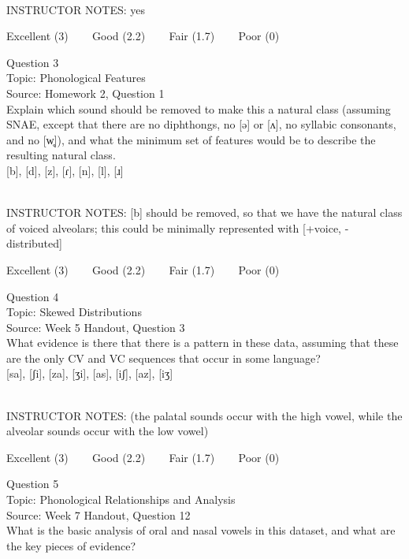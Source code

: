 \documentclass[12pt]{article}
\begin{document}
~\\
INSTRUCTOR NOTES: yes


\vfill
Excellent (3) ~~~ Good (2.2) ~~~ Fair (1.7) ~~~ Poor (0)
\newpage

{\large Question 3}\\

Topic: Phonological Features\\
Source: Homework 2, Question 1\\

Explain which sound should be removed to make this a natural class (assuming SNAE, except that there are no diphthongs, no [ə] or [ʌ], no syllabic consonants, and no [w̥]), and what the minimum set of features would be to describe the resulting natural class.\\

{[b]}, {[d]}, {[z]}, {[ɾ]}, {[n]}, {[l]}, {[ɹ]}


~\\
INSTRUCTOR NOTES: [b] should be removed, so that we have the natural class of voiced alveolars; this could be minimally represented with [+voice, -distributed]


\vfill
Excellent (3) ~~~ Good (2.2) ~~~ Fair (1.7) ~~~ Poor (0)
\newpage

{\large Question 4}\\

Topic: Skewed Distributions\\
Source: Week 5 Handout, Question 3\\

What evidence is there that there is a pattern in these data, assuming that these are the only CV and VC sequences that occur in some language?\\

{[sa]}, {[ʃi]}, {[za]}, {[ʒi]}, {[as]}, {[iʃ]}, {[az]}, {[iʒ]}


~\\
INSTRUCTOR NOTES: (the palatal sounds occur with the high vowel, while the alveolar sounds occur with the low vowel)


\vfill
Excellent (3) ~~~ Good (2.2) ~~~ Fair (1.7) ~~~ Poor (0)
\newpage

{\large Question 5}\\

Topic: Phonological Relationships and Analysis\\
Source: Week 7 Handout, Question 12\\

What is the basic analysis of oral and nasal vowels in this dataset, and what are the key pieces of evidence?\\
\end{document}
